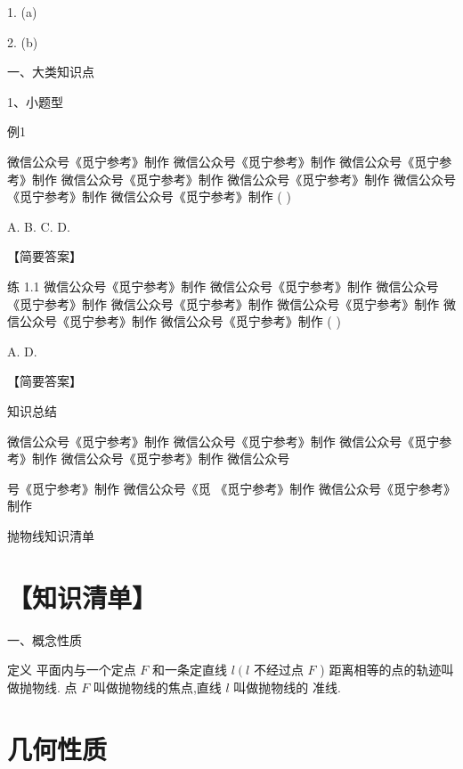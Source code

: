 \documentclass[10pt]{article}
\begin{document}
1. (a)

2. (b)

一、大类知识点

1、小题型

例1           

微信公众号《觅宁参考》制作 微信公众号《觅宁参考》制作 微信公众号《觅宁参考》制作 微信公众号《觅宁参考》制作 微信公众号《觅宁参考》制作 微信公众号 《觅宁参考》制作 微信公众号《觅宁参考》制作 ( )

A. B. C. D.

【简要答案】

练 1.1 微信公众号《觅宁参考》制作 微信公众号《觅宁参考》制作 微信公众号《觅宁参考》制作 微信公众号《觅宁参考》制作 微信公众号《觅宁参考》制作 微信公众号《觅宁参考》制作 微信公众号《觅宁参考》制作 ( )

A. D.

【简要答案】

知识总结

微信公众号《觅宁参考》制作 微信公众号《觅宁参考》制作 微信公众号《觅宁参考》制作 微信公众号《觅宁参考》制作 微信公众号

号《觅宁参考》制作 微信公众号《觅 《觅宁参考》制作 微信公众号《觅宁参考》制作

抛物线知识清单

\section*{【知识清单】}

一、概念性质

定义 平面内与一个定点 \(F\) 和一条定直线 \(l\left( l\right.\) 不经过点 \(F\) ) 距离相等的点的轨迹叫做抛物线. 点 \(F\) 叫做抛物线的焦点,直线 \(l\) 叫做抛物线的 准线.

\section*{几何性质}
\end{document}

